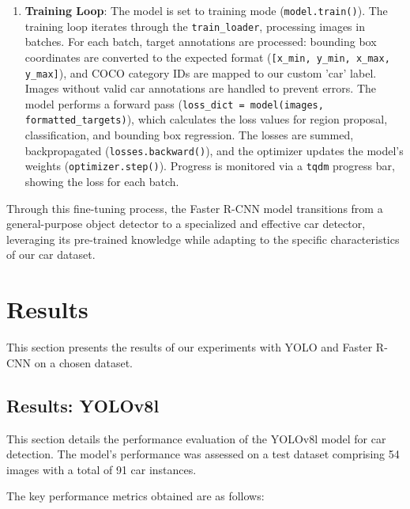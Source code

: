 \documentclass[12pt,a4paper]{article}
\begin{document}
\begin{enumerate}
    \item \textbf{Training Loop}:
    The model is set to training mode (\texttt{model.train()}). The training loop iterates through the \texttt{train\_loader}, processing images in batches. For each batch, target annotations are processed: bounding box coordinates are converted to the expected format (\texttt{[x\_min, y\_min, x\_max, y\_max]}), and COCO category IDs are mapped to our custom 'car' label. Images without valid car annotations are handled to prevent errors. The model performs a forward pass (\texttt{loss\_dict = model(images, formatted\_targets)}), which calculates the loss values for region proposal, classification, and bounding box regression. The losses are summed, backpropagated (\texttt{losses.backward()}), and the optimizer updates the model's weights (\texttt{optimizer.step()}). Progress is monitored via a \texttt{tqdm} progress bar, showing the loss for each batch.
\end{enumerate}

Through this fine-tuning process, the Faster R-CNN model transitions from a general-purpose object detector to a specialized and effective car detector, leveraging its pre-trained knowledge while adapting to the specific characteristics of our car dataset.

\section{Results}
\label{sec:results}
This section presents the results of our experiments with YOLO and Faster R-CNN on a chosen dataset. 
\subsection{Results: YOLOv8l}
\label{ssec:results_yolo}

This section details the performance evaluation of the YOLOv8l model for car detection. The model's performance was assessed on a test dataset comprising 54 images with a total of 91 car instances.

The key performance metrics obtained are as follows:
\end{document}
